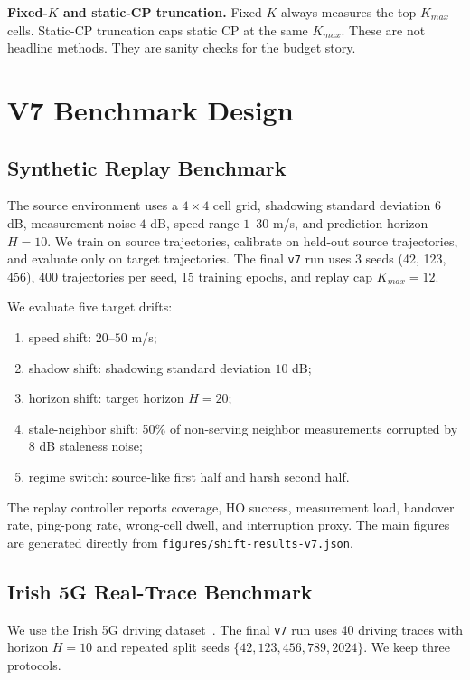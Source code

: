 \documentclass[conference]{IEEEtran}
\begin{document}
\textbf{Fixed-$K$ and static-CP truncation.} Fixed-$K$ always measures the top $K_{max}$ cells. Static-CP truncation caps static CP at the same $K_{max}$. These are not headline methods. They are sanity checks for the budget story.

\section{V7 Benchmark Design}

\subsection{Synthetic Replay Benchmark}

The source environment uses a $4 \times 4$ cell grid, shadowing standard deviation $6$ dB, measurement noise $4$ dB, speed range $1$--$30$ m/s, and prediction horizon $H=10$. We train on source trajectories, calibrate on held-out source trajectories, and evaluate only on target trajectories. The final \texttt{v7} run uses 3 seeds (42, 123, 456), 400 trajectories per seed, 15 training epochs, and replay cap $K_{max}=12$.

We evaluate five target drifts:
\begin{enumerate}
    \item speed shift: $20$--$50$ m/s;
    \item shadow shift: shadowing standard deviation $10$ dB;
    \item horizon shift: target horizon $H=20$;
    \item stale-neighbor shift: 50\% of non-serving neighbor measurements corrupted by 8 dB staleness noise;
    \item regime switch: source-like first half and harsh second half.
\end{enumerate}

The replay controller reports coverage, HO success, measurement load, handover rate, ping-pong rate, wrong-cell dwell, and interruption proxy. The main figures are generated directly from \texttt{figures/shift-results-v7.json}.

\subsection{Irish 5G Real-Trace Benchmark}

We use the Irish 5G driving dataset~\cite{irish5g}. The final \texttt{v7} run uses 40 driving traces with horizon $H=10$ and repeated split seeds $\{42,123,456,789,2024\}$. We keep three protocols.
\end{document}
